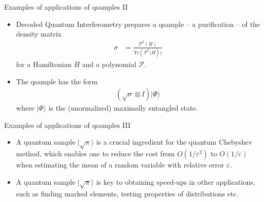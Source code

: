 \documentclass{beamer}
\renewcommand{\>}{\rangle}
\newcommand{\<}{\langle}
\begin{document}

\begin{frame}{Examples of applications of qsamples II}

\begin{itemize}
    \item Decoded Quantum Interferometry prepares a qsample -- a purification -- of the density matrix
    \begin{align*}
        \sigma &= \frac{\mathcal{P}^2(H)}{\mathrm{Tr}(\mathcal{P}^2\big(H)\big)}
    \end{align*}
    for a Hamiltonian $H$ and a polynomial $\mathcal{P}$.

    \bigskip
    \item 
    The qsample has the form
    \begin{align*}
        (\sqrt{\sigma} \otimes I) |\Phi\>
    \end{align*}
    where $|\Phi\>$ is the (unormalized) maximally entangled state.
\end{itemize}
    
\end{frame}


\begin{frame}{Examples of applications of qsamples III}

\begin{itemize}
    \item A quantum sample $|\sqrt{\pi}\>$ is a crucial ingredient for the quantum Chebyshev method, which enables one to reduce the cost from $O(1/\varepsilon^2)$ to $O(1/\varepsilon)$ when estimating the mean of a random variable with relative error $\varepsilon$.

    \bigskip

    \bigskip
    \item A quantum sample $|\sqrt{\pi}\>$ is key to obtaining speed-ups in other applications, such as finding marked elements, testing properties of distributions etc.

\end{itemize}
    
\end{frame}

\end{document}
